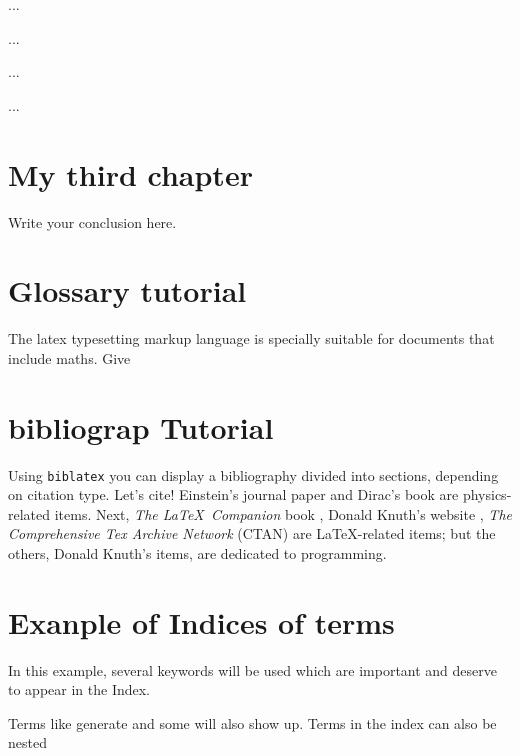 \documentclass[a4paper, 12pt, oneside, times, print, NoDraft]{template/UBtemplate}
\begin{document}
...

...

...

...



\chapter{My third chapter}

Write your conclusion here.






\chapter{Glossary tutorial}

 The \Gls{latex} typesetting markup language is specially suitable 
for documents that include \gls{maths}. Give



\chapter{bibliograp Tutorial}

Using \texttt{biblatex} you can display a bibliography divided into sections, depending on citation type. 
Let's cite! Einstein's journal paper \cite{einstein} and Dirac's book \cite{dirac} are physics-related items. 
Next, \textit{The \LaTeX\ Companion} book \cite{latexcompanion}, Donald Knuth's website \cite{knuthwebsite}, \textit{The Comprehensive Tex Archive Network} (CTAN) \cite{ctan} are \LaTeX-related items; but the others, Donald Knuth's items, \cite{knuth-fa,knuth-acp} are dedicated to programming.



\chapter{Exanple of Indices of terms}

In this example, several keywords will be 
used which are important and deserve to appear in the 
Index.

Terms like generate and some 
will also show up. Terms in the index can also be 
nested 













\end{document}
